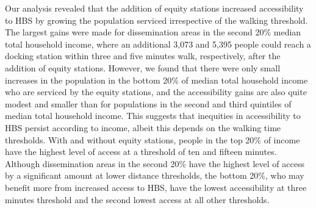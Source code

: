 \documentclass[]{elsarticle} %
\begin{document}
Our analysis revealed that the addition of equity stations increased
accessibility to HBS by growing the population serviced irrespective of
the walking threshold. The largest gains were made for dissemination
areas in the second 20\% median total household income, where an
additional 3,073 and 5,395 people could reach a docking station within
three and five minutes walk, respectively, after the addition of equity
stations. However, we found that there were only small increases in the
population in the bottom 20\% of median total household income who are
serviced by the equity stations, and the accessibility gains are also
quite modest and smaller than for populations in the second and third
quintiles of median total household income. This suggests that
inequities in accessibility to HBS persist according to income, albeit
this depends on the walking time thresholds. With and without equity
stations, people in the top 20\% of income have the highest level of
access at a threshold of ten and fifteen minutes. Although dissemination
areas in the second 20\% have the highest level of access by a
significant amount at lower distance thresholds, the bottom 20\%, who
may benefit more from increased access to HBS, have the lowest
accessibility at three minutes threshold and the second lowest access at
all other thresholds.
\end{document}
